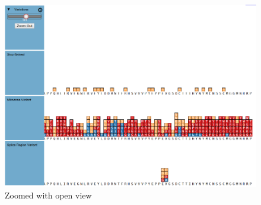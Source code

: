 \documentclass[twoside]{article}
\begin{document}
\begin{multicols}{2}
\begin{figure}
\includegraphics[width=\linewidth]{images/zoomedopen}
\caption{Zoomed with  open view}
\label{openwithzoomed}
\end{figure}


\end{multicols}
\end{document}
